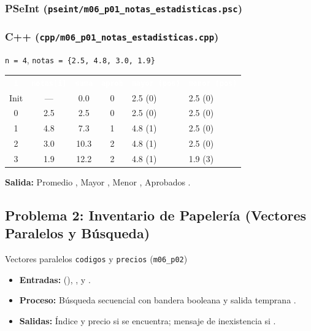 \documentclass[11pt,letterpaper]{article}
\begin{document}
\subsubsection*{PSeInt (\texttt{pseint/m06\_p01\_notas\_estadisticas.psc})}


\subsubsection*{C++ (\texttt{cpp/m06\_p01\_notas\_estadisticas.cpp})}


\begin{pruebaescritorio}{\texttt{n = 4}, \texttt{notas = \{2.5, 4.8, 3.0, 1.9\}}}
\begin{center}
\small
\renewcommand{\arraystretch}{1.2}
\begin{tabularx}{\linewidth}{c c c c X X}
  \rowcolor{AzulMarino}
  \textcolor{white}{\textbf{\texttt{i}}} & \textcolor{white}{\textbf{\texttt{notas[i]}}} & \textcolor{white}{\textbf{\texttt{suma}}} & \textcolor{white}{\textbf{\texttt{aprob}}} & \textcolor{white}{\textbf{\texttt{mayor (pos)}}} & \textcolor{white}{\textbf{\texttt{menor (pos)}}} \\
  Init & --- & 0.0 & 0 & 2.5 (0) & 2.5 (0) \\
  0 & 2.5 & 2.5 & 0 & 2.5 (0) & 2.5 (0) \\
  1 & 4.8 & 7.3 & 1 & 4.8 (1) & 2.5 (0) \\
  2 & 3.0 & 10.3 & 2 & 4.8 (1) & 2.5 (0) \\
  3 & 1.9 & 12.2 & 2 & 4.8 (1) & 1.9 (3) \\
\end{tabularx}
\end{center}
\textbf{Salida:} Promedio , Mayor , Menor , Aprobados .
\end{pruebaescritorio}

\subsection{Problema 2: Inventario de Papelería (Vectores Paralelos y Búsqueda)}
\begin{analisis}{Vectores paralelos \texttt{codigos} y \texttt{precios} (\texttt{m06\_p02})}
\begin{itemize}
  \item \textbf{Entradas:}  (), ,  y .
  \item \textbf{Proceso:} Búsqueda secuencial con bandera booleana  y salida temprana .
  \item \textbf{Salidas:} Índice y precio si se encuentra; mensaje de inexistencia si .
\end{itemize}
\end{analisis}
\end{document}
